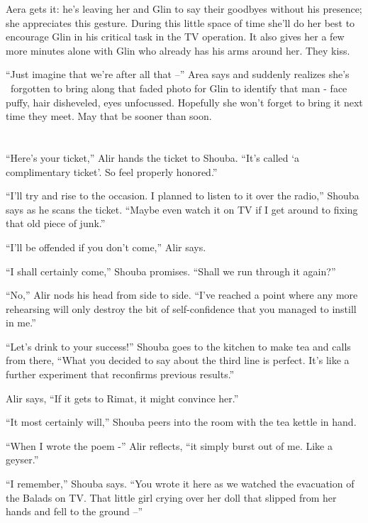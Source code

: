 \documentclass[twoside,11pt]{book}
\begin{document}
Aera gets it: he's leaving her and Glin to say their goodbyes without his presence; she appreciates this gesture.
During this little space of time she'll do her best to encourage Glin in his critical task in the TV operation. It
also gives her a few more minutes alone with Glin who already has his arms around her. They kiss.

``Just imagine that we're after all that --'' Area says and suddenly realizes she's
\ forgotten to bring along that faded photo for Glin to identify that man - face puffy, hair disheveled, eyes
unfocussed. Hopefully she won't forget to bring it next time they meet. May that be sooner than soon.



\chapter{}

``Here's your ticket,'' Alir hands the ticket to Shouba. ``It's called `a
complimentary ticket'. So feel properly honored.''

``I'll try and rise to the occasion. I planned to listen to it over the radio,'' Shouba says
as he scans the ticket. ``Maybe even watch it on TV if I get around to fixing that old piece of
junk.''

``I'll be offended if you don't come,'' Alir says.

``I shall certainly come,'' Shouba promises. ``Shall we run through it
again?''

``No,'' Alir nods his head from side to side. ``I've reached a point where any
more rehearsing will only destroy the bit of self-confidence that you managed to instill in me.''

``Let's drink to your success!'' Shouba goes to the kitchen to make tea and calls from there,
``What you decided to say about the third line is perfect. It's like a further experiment that reconfirms
previous results.''

Alir says, ``If it gets to Rimat, it might convince her.''

``It most certainly will,'' Shouba peers into the room with the tea kettle in hand.

``When I wrote the poem -'' Alir reflects, ``it simply burst out of me. Like a geyser.''

``I remember,'' Shouba says. ``You wrote it here as we watched the evacuation of
the Balads on TV. That little girl crying over her doll that slipped from her hands and fell to the ground
--''
\end{document}
